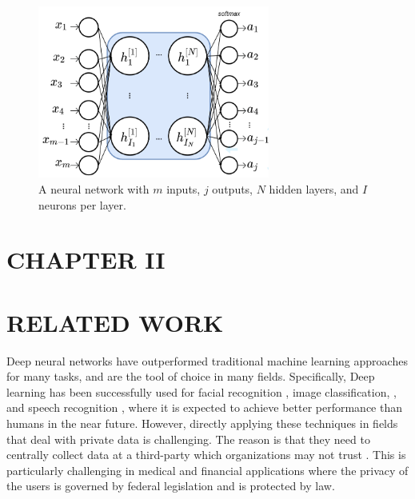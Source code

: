 \documentclass[letterpaper]{article}
\begin{document}
\begin{flushleft}
{%
\begin{figure}[H]
  \centering
    \includegraphics[width=3in]{SimpleNN.png}
    \caption[A simple neural network.]{\label{fig:atomsize} A neural network with $m$ inputs, $j$ outputs,  $N$  hidden layers, and $I$ neurons per layer.}
  \end{figure}


\pagebreak



\section*{CHAPTER II}


\vspace{0.25in}
\section{RELATED WORK}
Deep neural networks have outperformed traditional machine learning approaches for many tasks, and are the tool of choice in many
fields. Specifically, Deep learning has been successfully used for facial recognition \cite{krizhevsky2012imagenet, sun2014deep, ding2015robust}, image classification, 
\cite{simard2003best, ma2015hyperspectral, zhong2011bilinear}, and speech recognition \cite{hinton2012deep, graves2013speech, noda2015audio}, where it is expected to achieve better
performance than humans in the near future. However, directly applying these techniques in fields that deal with private data is
challenging. The reason is that they need to centrally collect data at a third-party which organizations may not trust
\cite{chicurel2000databasing}. This is particularly challenging in medical and financial applications where the privacy of the users is
governed by federal legislation and is protected by law. 

}
\end{flushleft}
\end{document}
